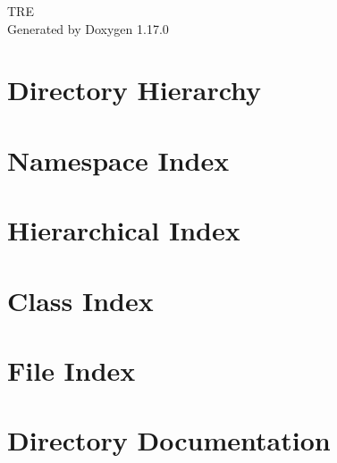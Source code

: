 \documentclass[twoside]{book}
\newcommand{\+}{\discretionary{\mbox{\scriptsize$\hookleftarrow$}}{}{}}
\newcommand{\clearemptydoublepage}{%
    \newpage{\pagestyle{empty}\cleardoublepage}%
  }
\begin{document}
  \raggedbottom
    \hypersetup{pageanchor=false,
                bookmarksnumbered=true,
                pdfencoding=unicode
               }
  \begin{titlepage}
  \vspace*{7cm}
  \begin{center}%
  {\Large TRE}\\
  \vspace*{1cm}
  {\large Generated by Doxygen 1.17.0}\\
  \end{center}
  \end{titlepage}
  \clearemptydoublepage
  \tableofcontents
  \clearemptydoublepage
  \hypersetup{pageanchor=true}
\chapter{Directory Hierarchy}

\chapter{Namespace Index}

\chapter{Hierarchical Index}

\chapter{Class Index}

\chapter{File Index}

\chapter{Directory Documentation}












\end{document}
